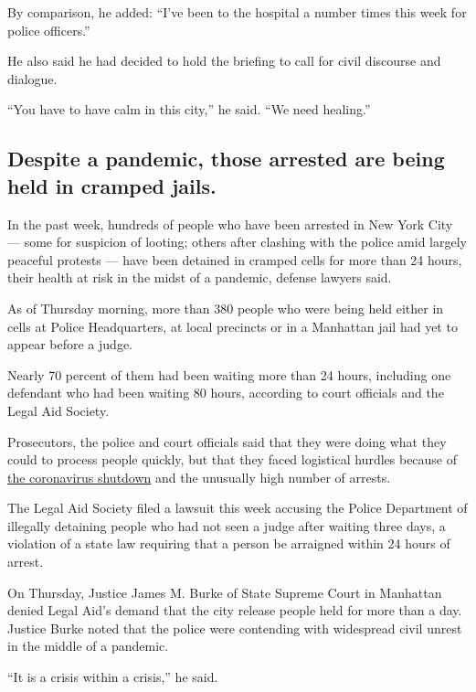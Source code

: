 By comparison, he added: ``I've been to the hospital a number times this
week for police officers.''

He also said he had decided to hold the briefing to call for civil
discourse and dialogue.

``You have to have calm in this city,'' he said. ``We need healing.''

\hypertarget{despite-a-pandemic-those-arrested-are-being-held-in-cramped-jails}{%
\subsection{Despite a pandemic, those arrested are being held in cramped
jails.}\label{despite-a-pandemic-those-arrested-are-being-held-in-cramped-jails}}

In the past week, hundreds of people who have been arrested in New York
City --- some for suspicion of looting; others after clashing with the
police amid largely peaceful protests --- have been detained in cramped
cells for more than 24 hours, their health at risk in the midst of a
pandemic, defense lawyers said.

As of Thursday morning, more than 380 people who were being held either
in cells at Police Headquarters, at local precincts or in a Manhattan
jail had yet to appear before a judge.

Nearly 70 percent of them had been waiting more than 24 hours, including
one defendant who had been waiting 80 hours, according to court
officials and the Legal Aid Society.

Prosecutors, the police and court officials said that they were doing
what they could to process people quickly, but that they faced
logistical hurdles because of
\href{https://www.nytimes3xbfgragh.onion/2020/06/04/world/coronavirus-us-update.html?module=inline}{the
coronavirus shutdown} and the unusually high number of arrests.

The Legal Aid Society filed a lawsuit this week accusing the Police
Department of illegally detaining people who had not seen a judge after
waiting three days, a violation of a state law requiring that a person
be arraigned within 24 hours of arrest.

On Thursday, Justice James M. Burke of State Supreme Court in Manhattan
denied Legal Aid's demand that the city release people held for more
than a day. Justice Burke noted that the police were contending with
widespread civil unrest in the middle of a pandemic.

``It is a crisis within a crisis,'' he said.

